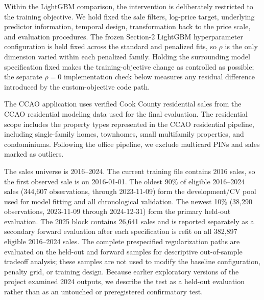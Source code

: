 \documentclass[10pt]{article}
\theoremstyle{definition}
\newcommand{\1}{\mathbf{1}}
\newcommand{\oldtext}[1]{\textcolor{blue}{\sout{#1}}}
\newcommand{\newtext}[1]{\textcolor{impGreen}{#1}}
\begin{document}
{Within the LightGBM comparison, the intervention is deliberately restricted to the training objective. We hold fixed the sale filters, log-price target, underlying predictor information, temporal design, transformation back to the price scale, and evaluation procedures. The frozen Section-2 LightGBM hyperparameter configuration is held fixed across the standard and penalized fits, so $\rho$ is the only dimension varied within each penalized family. 
\newtext{Holding the surrounding model specification fixed makes the training-objective change as controlled as possible; the separate $\rho=0$ implementation check below measures any residual difference introduced by the custom-objective code path.}}

The CCAO application uses verified Cook County residential sales {from the CCAO residential modeling data used for the final evaluation. }
{The residential scope includes the property types represented in the CCAO residential pipeline, including single-family homes, townhomes, small multifamily properties, and condominiums.}
Following the office pipeline, we exclude multicard PINs and sales marked as outliers.


{The sales universe is 2016--2024. The current training file contains 2016 sales, so the first observed sale is on 2016-01-01. The oldest 90\% of eligible 2016--2024 sales (344,607 observations, through 2023-11-09) form the development/CV pool used for model fitting and all chronological validation. The newest 10\% (38,290 observations, 2023-11-09 through 2024-12-31) form the primary held-out evaluation. The 2025 block contains 26,641 sales and is reported separately as a secondary forward evaluation after each specification is refit on all 382,897 eligible 2016--2024 sales. The complete prespecified regularization paths are evaluated on the held-out and forward samples for descriptive out-of-sample tradeoff analysis; these samples are not used to modify the baseline configuration, penalty grid, or training design. Because earlier exploratory versions of the project examined 2024 outputs, we describe the test as a held-out evaluation rather than as an untouched or preregistered confirmatory test.}
\end{document}
